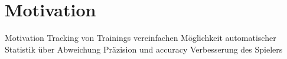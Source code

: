 
\chapter{Motivation}
\label{chap:motivation}

Motivation
Tracking von Trainings vereinfachen
Möglichkeit automatischer Statistik über Abweichung Präzision und accuracy
Verbesserung des Spielers
